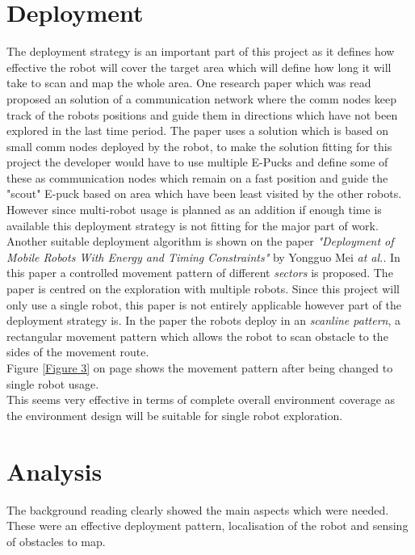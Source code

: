 \section{Deployment}
The deployment strategy is an important part of this project as it defines how effective the robot will cover the target area which will define how long it will take to scan and map the whole area. 
One research paper which was read proposed an solution of a communication network where the comm nodes keep track of the robots positions and guide them in directions which have not been explored in the last time period\cite{Batalin2003Coverage}. The paper uses a solution which is based on small comm nodes deployed by the robot, to make the solution fitting for this project the developer would have to use multiple E-Pucks and define some of these as communication nodes which remain on a fast position and guide the "scout" E-puck based on area which have been least visited by the other robots.\\ 
However since multi-robot usage is planned as an addition if enough time is available this deployment strategy is not fitting for the major part of work.\\[3ex]

Another suitable deployment algorithm is shown on the paper \textit{"Deployment of Mobile Robots With Energy and Timing Constraints"} by Yongguo Mei \textit{at al.}\cite{Mei2006Deployment}. In this paper a controlled movement pattern of different \textit{sectors} is proposed. The paper is centred on the exploration with multiple robots. Since this project will only use a single robot, this paper is not entirely applicable however part of the deployment strategy is. In the paper the robots deploy in an \textit{scanline pattern}, a rectangular movement pattern which allows the robot to scan obstacle to the sides of the movement route. \\
Figure \ref{Figure 3} on page \pageref{Figure 3} shows the movement pattern after being changed to single robot usage.\\
This seems very effective in terms of complete overall environment coverage as the environment design will be suitable for single robot exploration.

\section{Analysis}
The background reading clearly showed the main aspects which were needed.\\
These were an effective deployment pattern, localisation of the robot and sensing of obstacles to map. 

